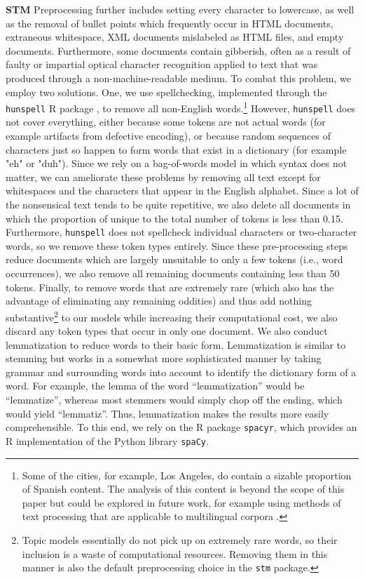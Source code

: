 \documentclass[11pt]{article}
\begin{document}
{\bf STM}
Preprocessing further includes setting every character to lowercase, as well as the removal of bullet points which frequently occur in HTML documents, extraneous whitespace, XML documents mislabeled as HTML files, and empty documents. Furthermore, some documents contain gibberish, often as a result of faulty or impartial optical character recognition applied to text that was produced through a non-machine-readable medium. To combat this problem, we employ two solutions. One, we use spellchecking, implemented through the \texttt{hunspell} R package \citep{hunspell}, to remove all non-English words.\footnote{Some of the cities, for example, Los Angeles, do contain a sizable proportion of Spanish content. The analysis of this content is beyond the scope of this paper but could be explored in future work, for example using methods of text processing that are applicable to multilingual corpora \citep{lucas2015computer}. } However, \texttt{hunspell} does not cover everything, either because some tokens are not actual words (for example artifacts from defective encoding), or because random sequences of characters just so happen to form words that exist in a dictionary (for example "eh" or "duh"). Since we rely on a bag-of-words model in which syntax does not matter, we can ameliorate these problems by removing all text except for whitespaces and the characters that appear in the English alphabet. Since a lot of the nonsensical text tends to be quite repetitive, we also delete all documents in which the proportion of unique to the total number of tokens is less than 0.15. Furthermore, \texttt{hunspell} does not spellcheck individual characters or two-character words, so we remove these token types entirely. Since these pre-processing steps reduce documents which are largely unsuitable to only a few tokens (i.e., word occurrences), we also remove all remaining documents containing less than 50 tokens. Finally, to remove words that are extremely rare (which also has the advantage of eliminating any remaining oddities) and thus add nothing substantive\footnote{Topic models essentially do not pick up on extremely rare words, so their inclusion is a waste of computational resources. Removing them in this manner is also the default preprocessing choice in the \texttt{stm} package.} to our models while increasing their computational cost, we also discard any token types that occur in only one document. We also conduct lemmatization to reduce words to their basic form. Lemmatization is similar to stemming but works in a somewhat more sophisticated manner by taking grammar and surrounding words into account to identify the dictionary form of a word. For example, the lemma of the word ``lemmatization'' would be ``lemmatize'', whereas most stemmers would simply chop off the ending, which would yield ``lemmatiz''. Thus, lemmatization makes the results more easily comprehensible. To this end, we rely on the R package \texttt{spacyr}, which provides an R implementation of the Python library \texttt{spaCy}.
\end{document}
